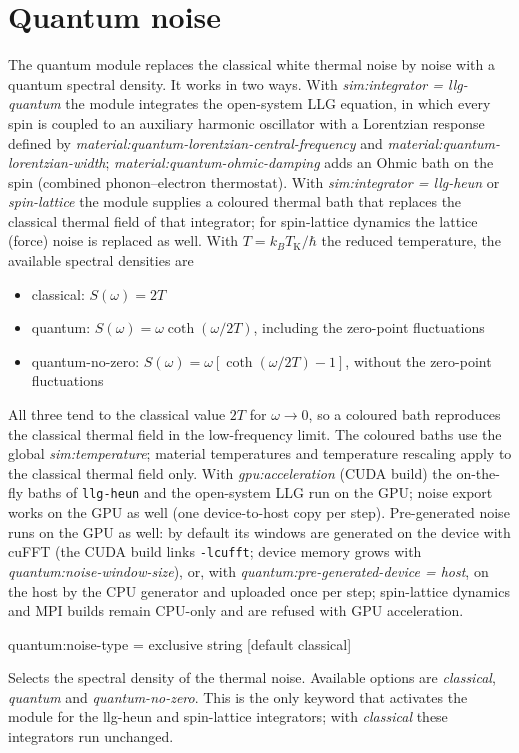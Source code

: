 \section*{Quantum noise}
The quantum module replaces the classical white thermal noise by noise with a quantum spectral density. It works in two ways. With \textit{sim:integrator = llg-quantum} the module integrates the open-system LLG equation, in which every spin is coupled to an auxiliary harmonic oscillator with a Lorentzian response defined by \textit{material:quantum-lorentzian-central-frequency} and \textit{material:quantum-lorentzian-width}; \textit{material:quantum-ohmic-damping} adds an Ohmic bath on the spin (combined phonon--electron thermostat). With \textit{sim:integrator = llg-heun} or \textit{spin-lattice} the module supplies a coloured thermal bath that replaces the classical thermal field of that integrator; for spin-lattice dynamics the lattice (force) noise is replaced as well. With $T = k_B T_{\mathrm{K}}/\hbar$ the reduced temperature, the available spectral densities are
\begin{itemize}
  \item[] classical: $S(\omega) = 2T$
  \item[] quantum: $S(\omega) = \omega\coth(\omega/2T)$, including the zero-point fluctuations
  \item[] quantum-no-zero: $S(\omega) = \omega\left[\coth(\omega/2T)-1\right]$, without the zero-point fluctuations
\end{itemize}
All three tend to the classical value $2T$ for $\omega \to 0$, so a coloured bath reproduces the classical thermal field in the low-frequency limit. The coloured baths use the global \textit{sim:temperature}; material temperatures and temperature rescaling apply to the classical thermal field only. With \textit{gpu:acceleration} (CUDA build) the on-the-fly baths of \texttt{llg-heun} and the open-system LLG run on the GPU; noise export works on the GPU as well (one device-to-host copy per step). Pre-generated noise runs on the GPU as well: by default its windows are generated on the device with cuFFT (the CUDA build links \texttt{-lcufft}; device memory grows with \textit{quantum:noise-window-size}), or, with \textit{quantum:pre-generated-device = host}, on the host by the CPU generator and uploaded once per step; spin-lattice dynamics and MPI builds remain CPU-only and are refused with GPU acceleration.

{\zicf quantum:noise-type = exclusive string [default classical]}
Selects the spectral density of the thermal noise. Available options are \textit{classical}, \textit{quantum} and \textit{quantum-no-zero}. This is the only keyword that activates the module for the llg-heun and spin-lattice integrators; with \textit{classical} these integrators run unchanged.

